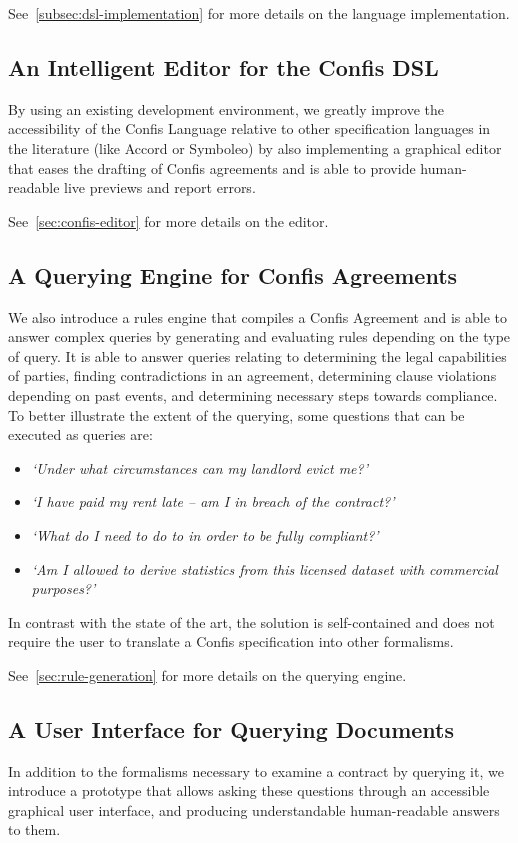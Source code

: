 See~\autoref{subsec:dsl-implementation} for more details on the language implementation.

\subsection{An Intelligent Editor for the Confis DSL}
By using an existing development environment, we greatly improve the accessibility of the Confis Language relative to other specification languages in the literature (like Accord or Symboleo) by also implementing a graphical editor that eases the drafting of Confis agreements and is able to provide human-readable live previews and report errors.

See~\autoref{sec:confis-editor} for more details on the editor.

\subsection{A Querying Engine for Confis Agreements}
We also introduce a rules engine that compiles a Confis Agreement and is able to answer complex queries by generating and evaluating rules depending on the type of query.
It is able to answer queries relating to determining the legal capabilities of parties, finding contradictions in an agreement, determining clause violations depending on past events, and determining necessary steps towards compliance.
To better illustrate the extent of the querying, some questions that can be executed as queries are:
\begin{itemize}
    \item \emph{`Under what circumstances can my landlord evict me?'}
    \item \emph{`I have paid my rent late -- am I in breach of the contract?'}
    \item \emph{`What do I need to do to in order to be fully compliant?'}
    \item \emph{`Am I allowed to derive statistics from this licensed dataset with commercial purposes?'}
\end{itemize}
In contrast with the state of the art, the solution is self-contained and does not require the user to translate a Confis specification into other formalisms.

See~\autoref{sec:rule-generation} for more details on the querying engine.


\subsection{A User Interface for Querying Documents}
In addition to the formalisms necessary to examine a contract by querying it, we introduce a prototype that allows asking these questions through an accessible graphical user interface, and producing understandable human-readable answers to them.

